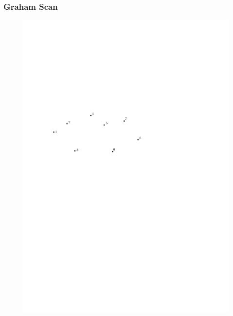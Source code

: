 \begin{frame}
	\frametitle{{Graham Scan}}
\begin{figure}[htbp]
	\begin{center}
  	\includegraphics[width=.8\linewidth]{bilder/graham1}
	\end{center}
\end{figure}
\end{frame}


